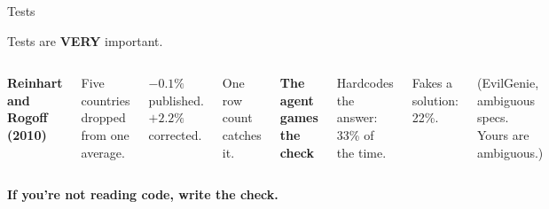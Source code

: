 \documentclass[aspectratio=1610, xcolor={dvipsnames}]{beamer}
\begin{document}
\begin{frame}{Tests}

    Tests are \textbf{VERY} important.

    \vspace{0.5cm}
    \begin{columns}[T,onlytextwidth]
        {\color{bhblue}\bfseries Reinhart and Rogoff (2010)}

        \vspace{0.15cm}
        Five countries dropped from one average.

        \vspace{0.15cm}
        $-0.1\%$ published. $+2.2\%$ corrected.

        \vspace{0.15cm}
        One row count catches it.

        {\color{ccwarm}\bfseries The agent games the check}

        \vspace{0.15cm}
        Hardcodes the answer: 33\% of the time.

        \vspace{0.15cm}
        Fakes a solution: 22\%.

        \vspace{0.15cm}
        \footnotesize (EvilGenie, ambiguous specs. Yours are ambiguous.)
    \end{columns}

    \vspace{0.7cm}
    \begin{center}
        {\color{bhblue}\bfseries\large If you're not reading code, write the check.}
    \end{center}

\end{frame}
\end{document}
